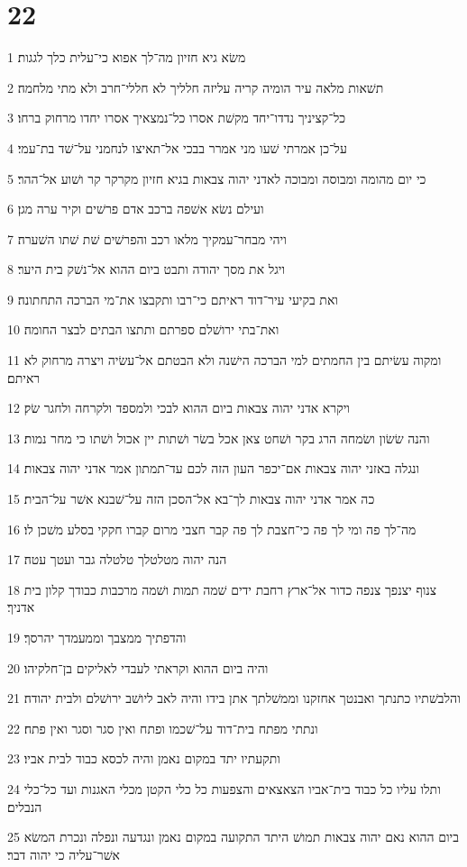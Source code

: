 \chapter{22}

\par 1 משׂא גיא חזיון מה־לך אפוא כי־עלית כלך לגגות׃
\par 2 תשׁאות מלאה עיר הומיה קריה עליזה חלליך לא חללי־חרב ולא מתי מלחמה׃
\par 3 כל־קציניך נדדו־יחד מקשׁת אסרו כל־נמצאיך אסרו יחדו מרחוק ברחו׃
\par 4 על־כן אמרתי שׁעו מני אמרר בבכי אל־תאיצו לנחמני על־שׁד בת־עמי׃
\par 5 כי יום מהומה ומבוסה ומבוכה לאדני יהוה צבאות בגיא חזיון מקרקר קר ושׁוע אל־ההר׃
\par 6 ועילם נשׂא אשׁפה ברכב אדם פרשׁים וקיר ערה מגן׃
\par 7 ויהי מבחר־עמקיך מלאו רכב והפרשׁים שׁת שׁתו השׁערה׃
\par 8 ויגל את מסך יהודה ותבט ביום ההוא אל־נשׁק בית היער׃
\par 9 ואת בקיעי עיר־דוד ראיתם כי־רבו ותקבצו את־מי הברכה התחתונה׃
\par 10 ואת־בתי ירושׁלם ספרתם ותתצו הבתים לבצר החומה׃
\par 11 ומקוה עשׂיתם בין החמתים למי הברכה הישׁנה ולא הבטתם אל־עשׂיה ויצרה מרחוק לא ראיתם׃
\par 12 ויקרא אדני יהוה צבאות ביום ההוא לבכי ולמספד ולקרחה ולחגר שׂק׃
\par 13 והנה שׂשׂון ושׂמחה הרג בקר ושׁחט צאן אכל בשׂר ושׁתות יין אכול ושׁתו כי מחר נמות׃
\par 14 ונגלה באזני יהוה צבאות אם־יכפר העון הזה לכם עד־תמתון אמר אדני יהוה צבאות׃
\par 15 כה אמר אדני יהוה צבאות לך־בא אל־הסכן הזה על־שׁבנא אשׁר על־הבית׃
\par 16 מה־לך פה ומי לך פה כי־חצבת לך פה קבר חצבי מרום קברו חקקי בסלע משׁכן לו׃
\par 17 הנה יהוה מטלטלך טלטלה גבר ועטך עטה׃
\par 18 צנוף יצנפך צנפה כדור אל־ארץ רחבת ידים שׁמה תמות ושׁמה מרכבות כבודך קלון בית אדניך׃
\par 19 והדפתיך ממצבך וממעמדך יהרסך׃
\par 20 והיה ביום ההוא וקראתי לעבדי לאליקים בן־חלקיהו׃
\par 21 והלבשׁתיו כתנתך ואבנטך אחזקנו וממשׁלתך אתן בידו והיה לאב ליושׁב ירושׁלם ולבית יהודה׃
\par 22 ונתתי מפתח בית־דוד על־שׁכמו ופתח ואין סגר וסגר ואין פתח׃
\par 23 ותקעתיו יתד במקום נאמן והיה לכסא כבוד לבית אביו׃
\par 24 ותלו עליו כל כבוד בית־אביו הצאצאים והצפעות כל כלי הקטן מכלי האגנות ועד כל־כלי הנבלים׃
\par 25 ביום ההוא נאם יהוה צבאות תמושׁ היתד התקועה במקום נאמן ונגדעה ונפלה ונכרת המשׂא אשׁר־עליה כי יהוה דבר׃

